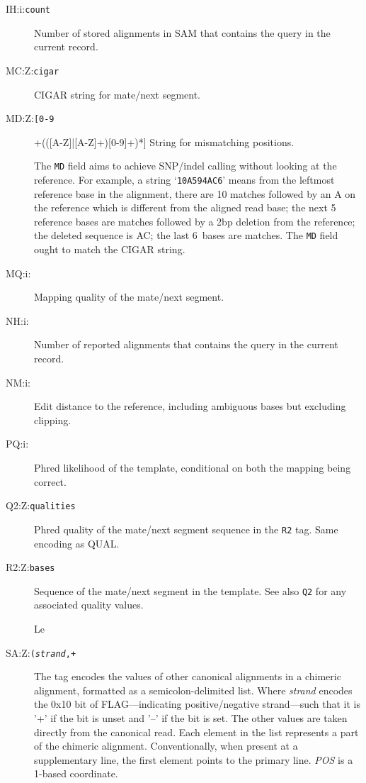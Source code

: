 \documentclass[10pt]{article}
\newcommand{\tagvalue}[1]{\tt #1}
\newcommand{\tagregex}[1]{\tt #1}
\begin{document}
\begin{description}
\item[IH:i:\tagvalue{count}]
Number of stored alignments in SAM that contains the query in the current
record.

\item[MC:Z:\tagvalue{cigar}]
CIGAR string for mate/next segment.

\item[MD:Z:\tagregex{[0-9]+(([A-Z]|[A-Z]+)[0-9]+)*}]
String for mismatching positions.

The {\tt MD} field aims to achieve SNP/indel calling without
looking at the reference. For example, a string `{\tt 10A5\char94AC6}' means
from the leftmost reference base in the alignment, there are 10 matches
followed by an A on the reference which is different from the aligned read
base; the next 5 reference bases are matches followed by a 2bp deletion from
the reference; the deleted sequence is AC; the last 6~bases are matches.
The {\tt MD} field ought to match the {\sf CIGAR} string.

\item[MQ:i:\tagvalue{}]
Mapping quality of the mate/next segment.

\item[NH:i:\tagvalue{}]
Number of reported alignments that contains the query in the current record.

\item[NM:i:\tagvalue{}]
Edit distance to the reference, including ambiguous bases but excluding clipping.

\item[PQ:i:\tagvalue{}]
Phred likelihood of the template, conditional on both the mapping being correct.

\item[Q2:Z:\tagvalue{qualities}]
Phred quality of the mate/next segment sequence in the {\tt R2} tag.
Same encoding as {\sf QUAL}.

\item[R2:Z:\tagvalue{bases}]
Sequence of the mate/next segment in the template.  See also {\tt Q2}
for any associated quality values.

Le\item[SA:Z:\tagregex{{\tt (}\emph{strand}{\tt ,}\sf{CIGAR}{\tt ,}\sf{MAPQ}{\tt ,}\sf{NM}{\tt ;)}+}]
The tag encodes the values of other canonical alignments in a chimeric alignment, formatted as a semicolon-delimited list. 
Where \emph{strand} encodes the 0x10 bit of {\sf FLAG}---indicating positive/negative strand---such that it is '+' if the bit is unset and '--' if the bit is set.
The other values are taken directly from the canonical read.
Each element in the list represents a part of the chimeric alignment. 
Conventionally, when present at a supplementary line, the first element points to the primary line.
\emph{\sf POS} is a 1-based coordinate.


\end{description}
\end{document}
